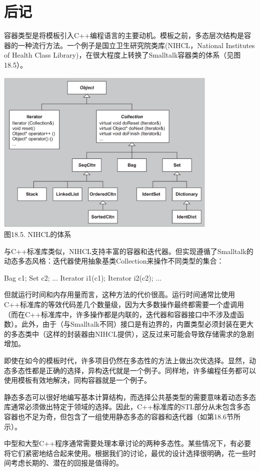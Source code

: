 \section{后记}
容器类型是将模板引入C++编程语言的主要动机。模板之前，多态层次结构是容器的一种流行方法。一个例子是国立卫生研究院类库(NIHCL，National Institutes of Health Class Library)，在很大程度上转换了Smalltalk容器类的体系（见图18.5）。

\begin{center}
\includegraphics[width=0.8\textwidth]{part3/ch18/images/5.png} \\
图18.5. NIHCL的体系
\end{center}

与C++标准库类似，NIHCL支持丰富的容器和迭代器。但实现遵循了Smalltalk的动态多态风格：迭代器使用抽象基类Collection来操作不同类型的集合：

\begin{cpp}
Bag c1;
Set c2;
...
Iterator i1(c1);
Iterator i2(c2);
...
\end{cpp}

但就运行时间和内存用量而言，这种方法的代价很高。运行时间通常比使用C++标准库的等效代码差几个数量级，因为大多数操作最终都需要一个虚调用（而在C++标准库中，许多操作都是内联的，迭代器和容器接口中不涉及虚函数）。此外，由于（与Smalltalk不同）接口是有边界的，内置类型必须封装在更大的多态类中（这样的封装器由NIHCL提供），这反过来可能会导致存储需求的急剧增加。

即使在如今的模板时代，许多项目仍然在多态性的方法上做出次优选择。显然，动态多态性都是正确的选择，异构迭代就是一个例子。同样地，许多编程任务都可以使用模板有效地解决，同构容器就是一个例子。

静态多态可以很好地编写基本计算结构，而选择公共基类型的需要意味着动态多态库通常必须做出特定于领域的选择。因此，C++标准库的STL部分从未包含多态容器也不足为奇，但包含了一组使用静态多态的容器和迭代器（如第18.6节所示）。

中型和大型C++程序通常需要处理本章讨论的两种多态性。某些情况下，有必要将它们紧密地结合起来使用。根据我们的讨论，最优的设计选择很明确，花一些时间考虑长期的、潜在的回报是值得的。





















